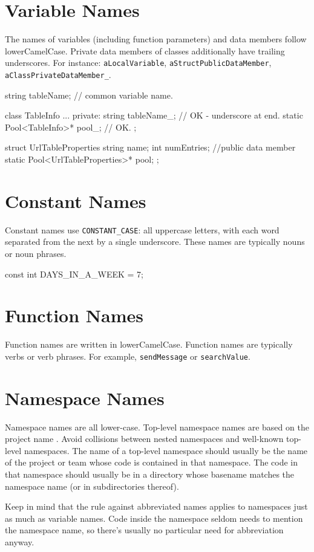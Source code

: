\documentclass[12pt,reqno]{book}      %
\begin{document}
\section{Variable Names}
The names of variables (including function parameters) and data members follow lowerCamelCase. Private data members of classes additionally have trailing underscores. For instance: \texttt{aLocalVariable}, \texttt{aStructPublicDataMember}, \texttt{aClassPrivateDataMember\_}.
\begin{Code}
string tableName;   // common variable name.

class TableInfo {
	...
	private:
	string tableName_;  // OK - underscore at end.
	static Pool<TableInfo>* pool_;  // OK.
};

struct UrlTableProperties {
	string name;
	int numEntries; //public data member
	static Pool<UrlTableProperties>* pool;
};	
\end{Code}

\section{Constant Names}
Constant names use \texttt{CONSTANT\_CASE}: all uppercase letters, with each word separated from the next by a single underscore. These names are typically nouns or noun phrases. 
\begin{Code}
const int DAYS_IN_A_WEEK = 7;	
\end{Code}

\section{Function Names}
Function names are written in lowerCamelCase.
Function names are typically verbs or verb phrases. For example, \texttt{sendMessage} or \texttt{searchValue}.

\section{Namespace Names}
Namespace names are all lower-case. Top-level namespace names are based on the project name . Avoid collisions between nested namespaces and well-known top-level namespaces.
The name of a top-level namespace should usually be the name of the project or team whose code is contained in that namespace. The code in that namespace should usually be in a directory whose basename matches the namespace name (or in subdirectories thereof).

Keep in mind that the rule against abbreviated names applies to namespaces just as much as variable names. Code inside the namespace seldom needs to mention the namespace name, so there's usually no particular need for abbreviation anyway.
\end{document}
